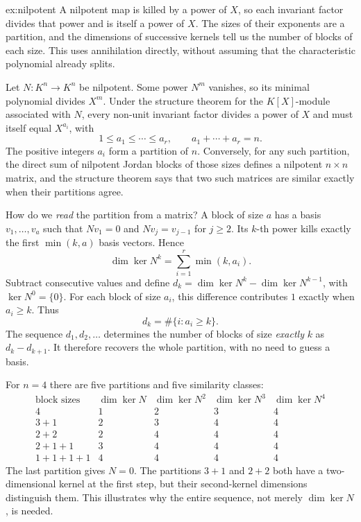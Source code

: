 \begin{solution}{ex:nilpotent}
\idea A nilpotent map is killed by a power of $X$, so each invariant factor divides that power and is itself a power of $X$. The sizes of their exponents are a partition, and the dimensions of successive kernels tell us the number of blocks of each size. This uses annihilation directly, without assuming that the characteristic polynomial already splits.

\writeup Let $N:K^n\to K^n$ be nilpotent. Some power $N^m$ vanishes, so its minimal polynomial divides $X^m$. Under the structure theorem for the $K[X]$-module associated with $N$, every non-unit invariant factor divides a power of $X$ and must itself equal $X^{a_i}$, with
\[
1\le a_1\le\cdots\le a_r,\qquad a_1+\cdots+a_r=n.
\]
The positive integers $a_i$ form a partition of $n$. Conversely, for any such partition, the direct sum of nilpotent Jordan blocks of those sizes defines a nilpotent $n\times n$ matrix, and the structure theorem says that two such matrices are similar exactly when their partitions agree.

How do we \emph{read} the partition from a matrix? A block of size $a$ has a basis $v_1,\ldots,v_a$ such that $Nv_1=0$ and $Nv_j=v_{j-1}$ for $j\ge2$. Its $k$-th power kills exactly the first $\min(k,a)$ basis vectors. Hence
\[
\dim\ker N^k=\sum_{i=1}^r\min(k,a_i).
\]
Subtract consecutive values and define $d_k=\dim\ker N^k-\dim\ker N^{k-1}$, with $\ker N^0=\{0\}$. For each block of size $a_i$, this difference contributes $1$ exactly when $a_i\ge k$. Thus
\[
d_k=\#\{i:a_i\ge k\}.
\]
The sequence $d_1,d_2,\ldots$ determines the number of blocks of size \emph{exactly} $k$ as $d_k-d_{k+1}$. It therefore recovers the whole partition, with no need to guess a basis.

For $n=4$ there are five partitions and five similarity classes:
\[
\begin{array}{c|cccc}
\text{block sizes}&\dim\ker N&\dim\ker N^2&\dim\ker N^3&\dim\ker N^4\\\hline
4&1&2&3&4\\
3+1&2&3&4&4\\
2+2&2&4&4&4\\
2+1+1&3&4&4&4\\
1+1+1+1&4&4&4&4
\end{array}
\]
The last partition gives $N=0$. The partitions $3+1$ and $2+2$ both have a two-dimensional kernel at the first step, but their second-kernel dimensions distinguish them. This illustrates why the entire sequence, not merely $\dim\ker N$, is needed.
\end{solution}

